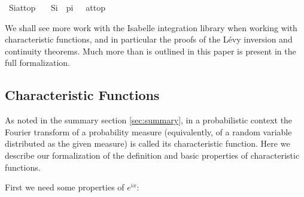 \documentclass[leqno]{article}
\theoremstyle{definition}
\begin{document}
\medskip

\begin{isabellebody}
\isamarkupfalse%
\ Si{\isacharunderscore}at{\isacharunderscore}top{\isacharcolon}\isanewline
\ \ \ {\isachardoublequoteopen}{\isacharparenleft}Si\ {\isacharminus}{\isacharminus}{\isacharminus}{\isachargreater}\ pi\ {\isacharslash}\ {}{\isacharparenright}\ at{\isacharunderscore}top{\isachardoublequoteclose}
\end{isabellebody}

\medskip

We shall see more work with the Isabelle integration library when working with characteristic functions, and in particular the proofs of the L\'evy inversion and continuity theorems. Much more than is outlined in this paper is present in the full formalization.

\subsection{Characteristic Functions} \label{sec:char}

As noted in the summary section \ref{sec:summary}, in a probabilistic context the Fourier transform of a probability measure (equivalently, of a random variable distributed as the given measure) is called its characteristic function. Here we describe our formalization of the definition and basic properties of characteristic functions.

First we need some properties of $e^{ix}$:

\medskip
\end{document}
